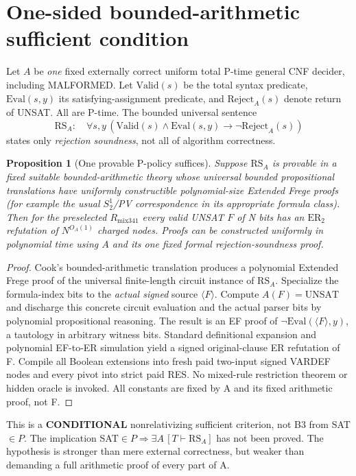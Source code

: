 \documentclass[11pt]{article}
\newtheorem{proposition}[theorem]{Proposition}
\begin{document}
\section*{One-sided bounded-arithmetic sufficient condition}
Let $A$ be \emph{one} fixed externally correct uniform total P-time general CNF decider, including MALFORMED. Let $\mathrm{Valid}(s)$ be the total syntax predicate, $\mathrm{Eval}(s,y)$ its satisfying-assignment predicate, and $\mathrm{Reject}_A(s)$ denote return of UNSAT. All are P-time. The bounded universal sentence
\[
\mathrm{RS}_A:\quad \forall s,y\,(\mathrm{Valid}(s)\land\mathrm{Eval}(s,y)\longrightarrow\neg\mathrm{Reject}_A(s))
\]
states only \emph{rejection soundness}, not all of algorithm correctness.
\begin{proposition}[One provable P-policy suffices]
Suppose $\mathrm{RS}_A$ is provable in a fixed suitable bounded-arithmetic theory whose universal bounded propositional translations have uniformly constructible polynomial-size Extended Frege proofs (for example the usual $S^1_2$/PV correspondence in its appropriate formula class). Then for the preselected $R_{\mathrm{mix341}}$ every valid UNSAT $F$ of N bits has an $\mathrm{ER}_2$ refutation of $N^{O_A(1)}$ charged nodes. Proofs can be constructed uniformly in polynomial time using $A$ and its one fixed formal rejection-soundness proof.
\end{proposition}
\begin{proof}
Cook's bounded-arithmetic translation produces a polynomial Extended Frege proof of the universal finite-length circuit instance of $\mathrm{RS}_A$. Specialize the formula-index bits to the \emph{actual signed} source $\langle F\rangle$. Compute $A(F)=\mathrm{UNSAT}$ and discharge this concrete circuit evaluation and the actual parser bits by polynomial propositional reasoning. The result is an EF proof of $\neg\mathrm{Eval}(\langle F\rangle,y)$, a tautology in arbitrary witness bits. Standard definitional expansion and polynomial EF-to-ER simulation yield a signed original-clause ER refutation of F. Compile all Boolean extensions into fresh paid two-input signed VARDEF nodes and every pivot into strict paid RES. No mixed-rule restriction theorem or hidden oracle is invoked. All constants are fixed by A and its fixed arithmetic proof, not F. \end{proof}
\noindent This is a \textbf{CONDITIONAL} nonrelativizing sufficient criterion, not B3 from SAT$\in P$. The implication SAT$\in P\Rightarrow\exists A\, [T\vdash\mathrm{RS}_A]$ has not been proved. The hypothesis is stronger than mere external correctness, but weaker than demanding a full arithmetic proof of every part of A.
\end{document}

